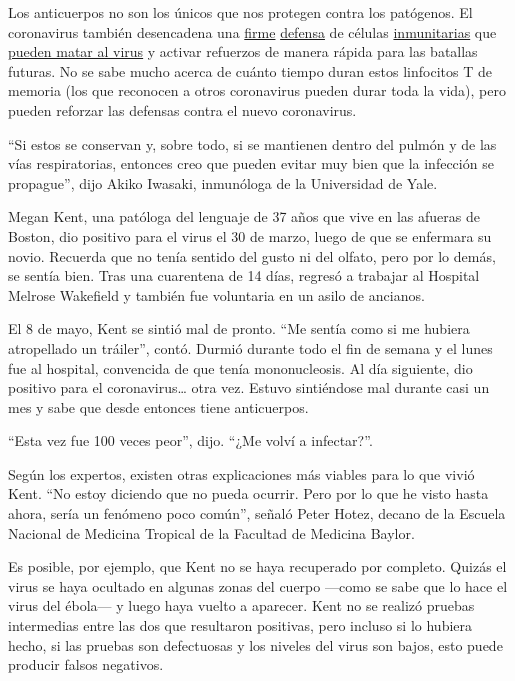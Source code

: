 Los anticuerpos no son los únicos que nos protegen contra los patógenos.
El coronavirus también desencadena una
\href{https://www.biorxiv.org/content/10.1101/2020.06.29.174888v1}{firme}
\href{https://www.medrxiv.org/content/10.1101/2020.04.11.20062349v2?\%253fcollection=}{defensa}
de células
\href{https://www.medrxiv.org/content/10.1101/2020.05.13.20100636v1?\%253fcollection=}{inmunitarias}
que \href{https://pubmed.ncbi.nlm.nih.gov/32473127/}{pueden matar al
virus} y activar refuerzos de manera rápida para las batallas futuras.
No se sabe mucho acerca de cuánto tiempo duran estos linfocitos T de
memoria (los que reconocen a otros coronavirus pueden durar toda la
vida), pero pueden reforzar las defensas contra el nuevo coronavirus.

``Si estos se conservan y, sobre todo, si se mantienen dentro del pulmón
y de las vías respiratorias, entonces creo que pueden evitar muy bien
que la infección se propague'', dijo Akiko Iwasaki, inmunóloga de la
Universidad de Yale.

Megan Kent, una patóloga del lenguaje de 37 años que vive en las afueras
de Boston, dio positivo para el virus el 30 de marzo, luego de que se
enfermara su novio. Recuerda que no tenía sentido del gusto ni del
olfato, pero por lo demás, se sentía bien. Tras una cuarentena de 14
días, regresó a trabajar al Hospital Melrose Wakefield y también fue
voluntaria en un asilo de ancianos.

El 8 de mayo, Kent se sintió mal de pronto. ``Me sentía como si me
hubiera atropellado un tráiler'', contó. Durmió durante todo el fin de
semana y el lunes fue al hospital, convencida de que tenía
mononucleosis. Al día siguiente, dio positivo para el
coronavirus\ldots{} otra vez. Estuvo sintiéndose mal durante casi un mes
y sabe que desde entonces tiene anticuerpos.

``Esta vez fue 100 veces peor'', dijo. ``¿Me volví a infectar?''.

Según los expertos, existen otras explicaciones más viables para lo que
vivió Kent. ``No estoy diciendo que no pueda ocurrir. Pero por lo que he
visto hasta ahora, sería un fenómeno poco común'', señaló Peter Hotez,
decano de la Escuela Nacional de Medicina Tropical de la Facultad de
Medicina Baylor.

Es posible, por ejemplo, que Kent no se haya recuperado por completo.
Quizás el virus se haya ocultado en algunas zonas del cuerpo ---como se
sabe que lo hace el virus del ébola--- y luego haya vuelto a aparecer.
Kent no se realizó pruebas intermedias entre las dos que resultaron
positivas, pero incluso si lo hubiera hecho, si las pruebas son
defectuosas y los niveles del virus son bajos, esto puede producir
falsos negativos.

